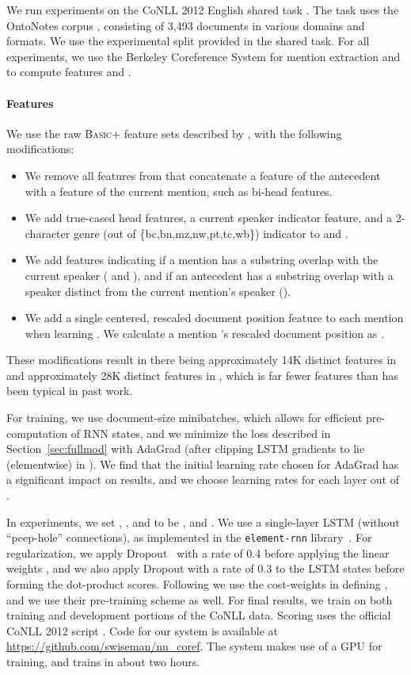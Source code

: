 \documentclass[11pt,letterpaper]{article}
\begin{document}
We run experiments on the CoNLL 2012 English shared task
\cite{conll12}. The task uses the OntoNotes corpus
\cite{hovy2006ontonotes}, consisting of 3,493 documents in various
domains and formats.  We
use the experimental split provided in the shared task.  For all
experiments, we use the Berkeley Coreference System \cite{DandK:13}
for mention extraction and to compute features  and
.

\paragraph{Features} We use the raw \textsc{Basic+} feature sets described by , with the following modifications:
\begin{itemize}
\item We remove all features from  that concatenate a feature of the antecedent with a feature of the current mention, such as bi-head features.
\item We add true-cased head features, a current speaker indicator feature, and a 2-character genre (out of \{bc,bn,mz,nw,pt,tc,wb\}) indicator to  and .
\item We add features indicating if a mention has a substring overlap with the current speaker ( and ), and if an antecedent has a substring overlap with a speaker distinct from the current mention's speaker ().
\item We add a single centered, rescaled document position feature to each mention when learning . We calculate a mention 's rescaled document position as . 
\end{itemize}
These modifications result in there being approximately 14K distinct features in  and approximately 28K distinct features in , which is far fewer features than has been typical in past work.

For training, we use document-size minibatches, which allows for efficient pre-computation of RNN states, and we minimize the loss described in Section~\ref{sec:fullmod} with AdaGrad \cite{duchi2011adaptive} (after clipping LSTM gradients to lie (elementwise) in ). We find that the initial learning rate chosen for AdaGrad has a significant impact on results, and we choose learning rates for each layer out of . 

In experiments, we set , , and  to be , and . We use a single-layer LSTM (without ``peep-hole'' connections), as implemented in the \texttt{element-rnn} library~\cite{elements}. For regularization, we apply Dropout~\cite{srivastava2014dropout} with a rate of 0.4 before applying the linear weights , and we also apply Dropout with a rate of 0.3 to the LSTM states before forming the dot-product scores. Following  we use the cost-weights  in defining , and we use their pre-training scheme as well. For final results, we train on both training and development portions of the CoNLL data. Scoring uses the official CoNLL 2012 script
\cite{pradhan2014scoring,luo2014extension}.  
Code for our system is available at \url{https://github.com/swiseman/nn_coref}. The system makes use of a GPU for training, and trains in about two hours.
 
\end{document}
